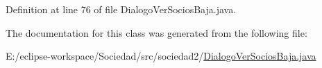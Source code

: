 Definition at line 76 of file Dialogo\+Ver\+Socios\+Baja.\+java.



The documentation for this class was generated from the following file\+:\begin{DoxyCompactItemize}
\item 
E\+:/eclipse-\/workspace/\+Sociedad/src/sociedad2/\mbox{\hyperlink{_dialogo_ver_socios_baja_8java}{Dialogo\+Ver\+Socios\+Baja.\+java}}\end{DoxyCompactItemize}
